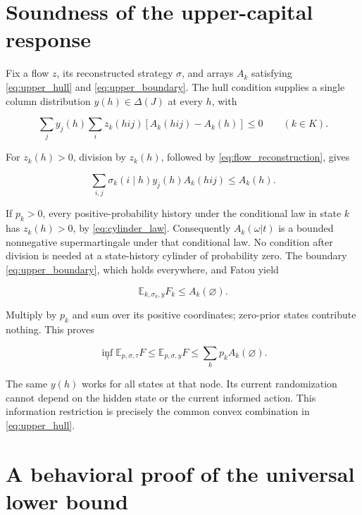 \documentclass[11pt,a4paper]{article}
\begin{document}
\section{Soundness of the upper-capital response}

Fix a flow \(z\), its reconstructed strategy \(\sigma\), and arrays \(A_k\) satisfying \eqref{eq:upper_hull} and \eqref{eq:upper_boundary}. The hull condition supplies a single column distribution \(y(h)\in\Delta(J)\) at every \(h\), with

\begin{equation}
\sum_jy_j(h)\sum_i z_k(hij)
 [A_k(hij)-A_k(h)]\le0\qquad(k\in K). \label{eq:response_weighted_step}
\end{equation}

For \(z_k(h)>0\), division by \(z_k(h)\), followed by \eqref{eq:flow_reconstruction}, gives

\begin{equation}
\sum_{i,j}\sigma_k(i\mid h)y_j(h)A_k(hij)\le A_k(h).
\label{eq:response_step}
\end{equation}

If \(p_k>0\), every positive-probability history under the conditional law in state \(k\) has \(z_k(h)>0\), by \eqref{eq:cylinder_law}. Consequently \(A_k(\omega|t)\) is a bounded nonnegative supermartingale under that conditional law. No condition after division is needed at a state-history cylinder of probability zero. The boundary \eqref{eq:upper_boundary}, which holds everywhere, and Fatou yield

\[
\mathbb E_{k,\sigma_k,y}F_k\le A_k(\varnothing).
\]

Multiply by \(p_k\) and sum over its positive coordinates; zero-prior states contribute nothing. This proves

\begin{equation}
\inf_\tau\mathbb E_{p,\sigma,\tau}F
\le\mathbb E_{p,\sigma,y}F
\le\sum_kp_k A_k(\varnothing). \label{eq:response_bound}
\end{equation}

The same \(y(h)\) works for all states at that node. Its current randomization cannot depend on the hidden state or the current informed action. This information restriction is precisely the common convex combination in \eqref{eq:upper_hull}.

\section{A behavioral proof of the universal lower bound}
\end{document}
